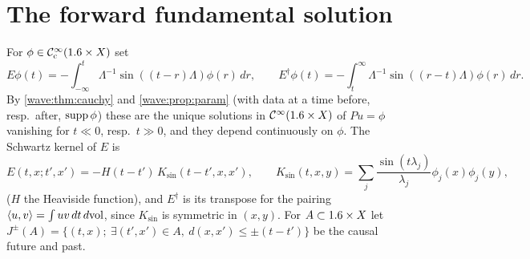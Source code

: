 \section{The forward fundamental solution}\label{wave:sec:forward}

For $\phi\in\mathcal{C}^\infty_{\mathrm{c}}(1.6\times X)$ set
\begin{equation*}
E\phi(t)=-\int_{-\infty}^t\Lambda^{-1}\sin((t-r)\Lambda)\phi(r)\,dr,\qquad
E^\dagger\phi(t)=-\int_t^\infty\Lambda^{-1}\sin((r-t)\Lambda)\phi(r)\,dr .
\end{equation*}
By \cref{wave:thm:cauchy} and \cref{wave:prop:param} (with data at a time
before, resp.\ after, $\operatorname{supp}\phi$) these are the unique solutions in $\mathcal{C}^\infty(1.6\times X)$ of
$Pu=\phi$ vanishing for $t\ll0$, resp.\ $t\gg0$, and they depend continuously on
$\phi$. The Schwartz kernel of $E$ is
\begin{equation}\label{wave:eq:E-kernel}
E(t,x;t',x')=-H(t-t')\,K_{\sin}(t-t',x,x'),\qquad
K_{\sin}(t,x,y)=\sum_j\frac{\sin(t\lambda_j)}{\lambda_j}\phi_j(x)\phi_j(y),
\end{equation}
($H$ the Heaviside function), and $E^\dagger$ is its transpose for the
pairing $\langle u, v\rangle=\int uv\,dt\,d\mathrm{vol}$, since $K_{\sin}$ is symmetric in $(x,y)$.
For $A\subset1.6\times X$ let
$J^\pm(A)=\{(t,x);\ \exists(t',x')\in A,\ d(x,x')\le\pm(t-t')\}$ be the causal
future and past.

